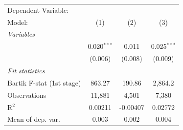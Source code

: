 \begin{tabular}{lccc}
   \tabularnewline \midrule \midrule
   Dependent Variable: & \\
   Model:                                                                & (1)           & (2)      & (3)\\  
   \midrule
   \emph{Variables}\\
        & 0.020$^{***}$ & 0.011    & 0.025$^{***}$\\   
                                                                         & (0.006)       & (0.008)  & (0.009)\\   
   \midrule
   \emph{Fit statistics}\\
   Bartik F-stat (1st stage)                                     & 863.27        & 190.86   & 2,864.2\\  
   Observations                                                          & 11,881        & 4,501    & 7,380\\  
   R$^2$                                                                 & 0.00211       & -0.00407 & 0.02772\\  
   Mean of dep. var.                                                     & 0.003         & 0.002    & 0.004\\  
\bottomrule
\end{tabular}
